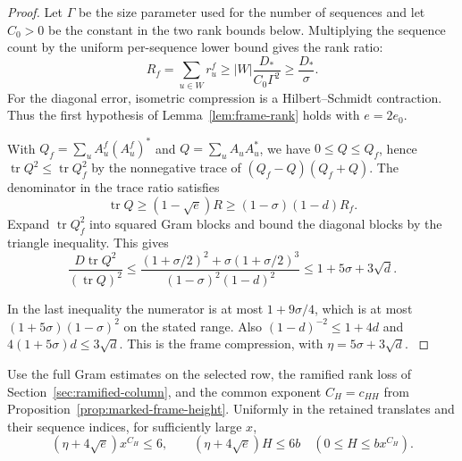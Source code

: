 \begin{proof}
Let \(\Gamma\) be the size parameter used for the number of
sequences and let \(C_0>0\) be the constant in the two rank
bounds below. Multiplying the sequence count by the uniform per-sequence lower
bound gives the rank ratio:
\[
 R_f=\sum_{u\in W}r_u^f\ge |W|\frac{D_*}{C_0\Gamma^2}
       \ge\frac{D_*}{\sigma}.
\]
For the diagonal error, isometric compression is a
Hilbert--Schmidt contraction. Thus the first hypothesis of
Lemma~\ref{lem:frame-rank} holds with \(e=2e_0\).

With \(Q_f=\sum_u A_u^f(A_u^f)^*\) and \(Q=\sum_u A_u A_u^*\),
we have \(0\le Q\le Q_f\), hence
\(\operatorname{tr}Q^2\le\operatorname{tr}Q_f^2\) by the
nonnegative trace of \((Q_f-Q)(Q_f+Q)\).
The denominator in the trace ratio satisfies
\[
 \operatorname{tr}Q\ge(1-\sqrt e)R\ge(1-\sigma)(1-d)R_f .
\]
Expand \(\operatorname{tr}Q_f^2\) into squared Gram blocks and
bound the diagonal blocks by the triangle inequality. This gives
\[
 \frac{D\operatorname{tr}Q^2}{(\operatorname{tr}Q)^2}
 \le
 \frac{(1+\sigma/2)^2+\sigma(1+\sigma/2)^3}
 {(1-\sigma)^2(1-d)^2}
 \le 1+5\sigma+3\sqrt d .
\]

In the last inequality the numerator is at most \(1+9\sigma/4\),
which is at most \((1+5\sigma)(1-\sigma)^2\) on the stated
range. Also \((1-d)^{-2}\le1+4d\) and
\(4(1+5\sigma)d\le3\sqrt d\).
This is the frame compression, with \(\eta=5\sigma+3\sqrt d\).
\label{cor:frames-2}

\end{proof}



\begin{lemma}\label{lem:trace-at-height}
Use the full Gram estimates on the selected row, the ramified rank
loss of Section~\ref{sec:ramified-column}, and the common exponent
\(C_H=c_{HH}\) from Proposition~\ref{prop:marked-frame-height}.
Uniformly in the retained translates and their sequence indices,
for sufficiently large \(x\),
\begin{equation}\label{eq:normalized-trace-product}
 (\eta+4\sqrt e)x^{C_H}\le6,\qquad
 (\eta+4\sqrt e)H\le6b\quad (0\le H\le bx^{C_H}).
\end{equation}
\end{lemma}

